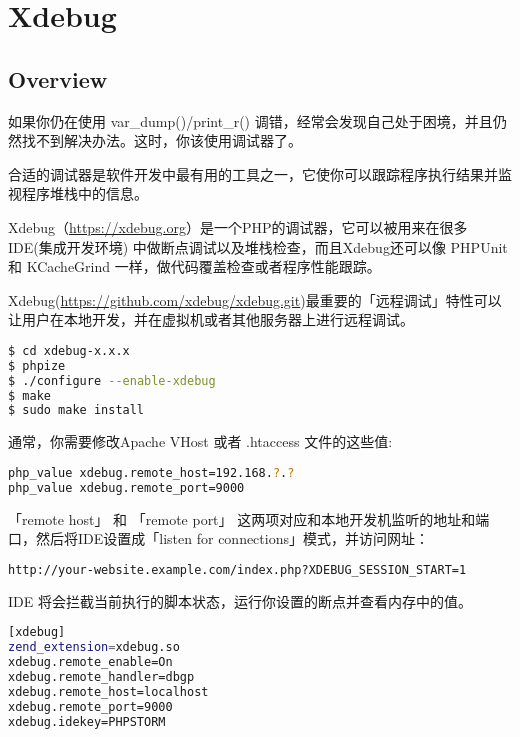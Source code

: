 \part{Xdebug}


\chapter{Overview}

如果你仍在使用 var\_dump()/print\_r() 调错，经常会发现自己处于困境，并且仍然找不到解决办法。这时，你该使用调试器了。

合适的调试器是软件开发中最有用的工具之一，它使你可以跟踪程序执行结果并监视程序堆栈中的信息。 

Xdebug（\url{https://xdebug.org}）是一个PHP的调试器，它可以被用来在很多 IDE(集成开发环境) 中做断点调试以及堆栈检查，而且Xdebug还可以像 PHPUnit 和 KCacheGrind 一样，做代码覆盖检查或者程序性能跟踪。



Xdebug(\url{https://github.com/xdebug/xdebug.git})最重要的「远程调试」特性可以让用户在本地开发，并在虚拟机或者其他服务器上进行远程调试。


\begin{lstlisting}[language=bash]
$ cd xdebug-x.x.x
$ phpize
$ ./configure --enable-xdebug
$ make
$ sudo make install
\end{lstlisting}

通常，你需要修改Apache VHost 或者 .htaccess 文件的这些值:

\begin{lstlisting}[language=bash]
php_value xdebug.remote_host=192.168.?.?
php_value xdebug.remote_port=9000
\end{lstlisting}



「remote host」 和 「remote port」 这两项对应和本地开发机监听的地址和端口，然后将IDE设置成「listen for connections」模式，并访问网址：


\begin{lstlisting}[language=bash]
http://your-website.example.com/index.php?XDEBUG_SESSION_START=1
\end{lstlisting}



IDE 将会拦截当前执行的脚本状态，运行你设置的断点并查看内存中的值。


\begin{lstlisting}[language=bash]
[xdebug]
zend_extension=xdebug.so
xdebug.remote_enable=On
xdebug.remote_handler=dbgp
xdebug.remote_host=localhost
xdebug.remote_port=9000
xdebug.idekey=PHPSTORM
\end{lstlisting}

